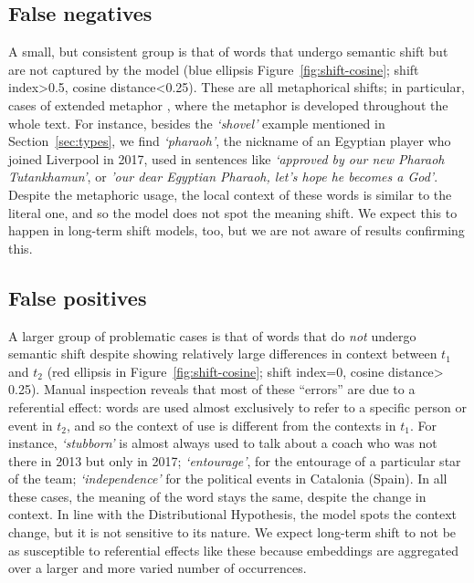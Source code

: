 \subsection{False negatives}
\label{subsec:False negatives}

A small, but consistent group is that of %
words that undergo semantic shift but are not captured by the model
(blue ellipsis Figure~\ref{fig:shift-cosine}; shift index\textgreater 0.5, cosine distance\textless 0.25).
These are all metaphorical shifts; in particular, cases of extended
metaphor \cite{werth1994extended}, where the metaphor is 
developed throughout the whole text.
For instance, besides the {\em `shovel'} example mentioned in Section~\ref{sec:types}, we find {\em `pharaoh'}, the nickname of an Egyptian player who
joined Liverpool in 2017, used in
sentences like \textit{`approved by our new Pharaoh Tutankhamun'}, or \textit{'our dear Egyptian Pharaoh, let's hope he becomes a God'}.
Despite the metaphoric usage, the local context of these words is similar to the literal one, and so the model does not spot the meaning shift. We expect this to happen in long-term shift models, too, but we are not aware of results confirming this.

\subsection{False positives}
\label{subsec:False positives}
A larger group of problematic cases is that of %
words that do \textit{not} undergo semantic shift despite showing
relatively large differences in context between $t_1$ and $t_2$ (red ellipsis in
Figure~\ref{fig:shift-cosine}; shift index=0, cosine distance\textgreater	
0.25). Manual inspection reveals that most of these ``errors'' 
are due to a referential effect: words are used
almost exclusively to refer to a specific person or event in $t_2$, and
so the context of use is different from the contexts in $t_1$.
For instance, {\em `stubborn'} is
almost always used to talk about a coach who was not
there in 2013 but only in 2017; 
{\em `entourage'}, for the entourage of a particular star of the team; {\em `independence'} for the
political events in Catalonia (Spain). 
In all these cases, the meaning of the word stays the same, %
despite the change in context. In line with the Distributional
Hypothesis, the model spots the context change, but it is not
sensitive to its nature. We expect long-term shift to not be as
susceptible to referential effects 
like these because
embeddings are aggregated over a larger and more varied number of
occurrences.

